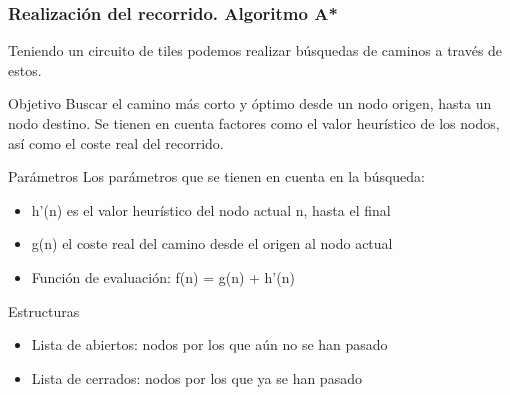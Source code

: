 \begin{frame}
    \frametitle{Realización del recorrido. Algoritmo A*}

    
    Teniendo un circuito de tiles podemos realizar búsquedas de caminos a través de estos.

        \begin{block}{Objetivo}
        Buscar el camino más corto y óptimo desde
        un nodo origen, hasta un nodo destino. Se tienen en cuenta factores
        como el valor heurístico de los nodos, así como el coste real del recorrido.
        \end{block}

        \begin{block}{Parámetros}
        Los parámetros que se tienen en cuenta en la búsqueda:
            \begin{itemize}
                \item h’(n) es el valor heurístico del nodo actual n, hasta el final
                \item g(n) el coste real del camino desde el origen al nodo actual
                \item Función de evaluación: f(n) = g(n) + h’(n)
            \end{itemize}
        \end{block}

        \begin{block}{Estructuras}
            \begin{itemize}
                \item Lista de abiertos: nodos por los que aún no se han pasado
                \item Lista de cerrados: nodos por los que ya se han pasado
            \end{itemize}
        \end{block}
        
\end{frame}

